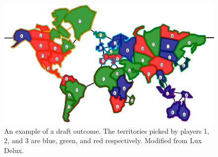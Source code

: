 \documentclass[letterpaper]{article}
\numberwithin{equation}{section}
\numberwithin{theorem}{section}
\numberwithin{lemma}{section}
\numberwithin{df}{section}
\begin{document}
\begin{figure}[t]
	\centering
	\includegraphics[scale=0.3]{../ForPublication/figs/DraftExample.png}
	\caption{An example of a draft outcome.  The territories picked by players 1, 2, and 3 are blue, green, and red respectively.  %
	Modified from Lux Delux.}
	\label{fig:DraftExample}
\end{figure}
\end{document}
